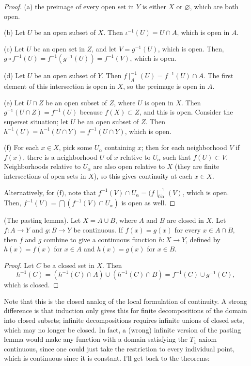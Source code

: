 \documentclass[10pt]{report}
\begin{document}
\begin{proof}
  (a) the preimage of every open set in $Y$ is either $X$ or $\varnothing$, which are both open.
  
  (b) Let $U$ be an open subset of $X$.
  Then $\iota^{-1}(U) = U \cap A$, which is open in $A$.

  (c) Let $U$ be an open set in $Z$, and let $V = g^{-1}(U)$, which is open.
  Then, $g \circ f^{-1}(U) = f^{-1}(g^{-1}(U)) = f^{-1}(V)$, which is open.

  (d) Let $U$ be an open subset of $Y$.
  Then $f \mid _A^{-1}(U) = f^{-1}(U) \cap A$.
  The first element of this intersection is open in $X$, so the preimage is open in $A$.

  (e) Let $U \cap Z$ be an open subset of $Z$, where $U$ is open in $X$.
  Then $g^{-1}(U \cap Z) = f^{-1}(U)$ because $f(X) \subset Z$, and this is open.
  Consider the superset situation; let $U$ be an open subset of $Z$.
  Then $h^{-1}(U) = h^{-1}(U \cap Y) = f^{-1}(U \cap Y)$, which is open.

  (f) For each $x \in X$, pick some $U_\alpha$ containing $x$; then for each neighborhood $V$ if $f(x)$, there is a neighborhood $U$ of $x$ relative to $U_\alpha$ such that $f(U) \subset V$.
  Neighborhoods relative to $U_\alpha$ are also open relative to $X$ (they are finite intersections of open sets in $X$), so this gives continuity at each $x \in X$.

  Alternatively, for (f), note that $f^{-1}(V) \cap U_\alpha = (f \mid _{U \alpha}^{-1}(V)$, which is open.
  Then, $f^{-1}(V) = \bigcap (f^{-1}(V) \cap U_\alpha)$ is open as well.
\end{proof}

\begin{theorem}
  {\normalfont (The pasting lemma).} Let $X = A \cup B$, where $A$ and $B$ are closed in $X$.
  Let $f:A \rightarrow Y$ and $g:B \rightarrow Y$ be continuous.
  If $f(x) = g(x)$ for every $x \in A \cap B$, then $f$ and $g$ combine to give a continuous function $h:X \rightarrow Y$, defined by $h(x) = f(x)$ for $x \in A$ and $h(x) = g(x)$ for $x \in B$.
\end{theorem}
\begin{proof}
  Let $C$ be a closed set in $X$.
  Then
  \[
    h^{-1}(C) 
    = (h^{-1}(C) \cap A) \cup (h^{-1}(C) \cap B)
    = f^{-1}(C) \cup g^{-1}(C),
  \]
  which is closed.
\end{proof}

Note that this is the closed analog of the local formulation of continuity.
A strong difference is that induction only gives this for finite decompositions of the domain into closed subsets; infinite decompositions requires infinite unions of closed sets, which may no longer be closed.
In fact, a (wrong) infinite version of the pasting lemma would make any function with a domain satisfying the $T_1$ axiom continuous, since one could just take the restriction to every individual point, which is continuous since it is constant.
I'll get back to the theorems:
\end{document}
